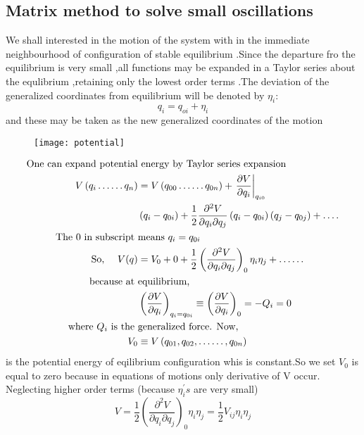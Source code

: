 \subsection{Matrix method to solve small oscillations}
We shall interested in the motion of the system with in the immediate neighbourhood of configuration of stable equilibrium .Since the departure fro the equilibrium is very small ,all functions may be expanded in a Taylor series about the equlibrium ,retaining only the lowest order terms .The deviation of the generalized coordinates from equilibrium will be denoted by $\eta_i$:\\
$$q_i=q_{oi}+\eta_i$$
and these may be taken as the new generalized coordinates of the motion  
\begin{figure}[H]
	\centering
	\texttt{[image: potential]}
	\caption{}
	\label{}
\end{figure}
\begin{align}
\text{One can expand potential}&\text{ energy by Taylor series expansion}\notag\\
V\left(q_{i} \ldots \ldots q_{n}\right)&=V\left(q_{00} \ldots \ldots q_{0 n}\right)+\left.\frac{\partial V}{\partial q_{i}}\right|_{q_{i 0}}\notag\\
&\left(q_{i}-q_{0 i}\right)+\frac{1}{2} \frac{\partial^{2} V}{\partial q_{i} \partial q_{j}}\left(q_{i}-q_{0 i}\right)\left(q_{j}-q_{0 j}\right)+\ldots .\notag\\
\text{The 0 in subscript }&\text{means }q_{i}=q_{0 i}\notag\\
\text{So, }\quad V(q)&=V_{0}+0+\frac{1}{2}\left(\frac{\partial^{2} V}{\partial q_{i} \partial q_{j}}\right)_{0} \eta_{i} \eta_{j}+\ldots \ldots \label{ref1}\\
\text{because at }&\text{equilibrium,}\notag\\
&\left(\frac{\partial V}{\partial q_{i}}\right)_{q_{i}=q_{0 i}} \equiv\left(\frac{\partial V}{\partial q_{i}}\right)_{0}=-Q_{i}=0\notag\\
\text{where $Q_{i}$ is the }&\text{generalized force. Now,}\\
V_{0} &\equiv V\left(q_{01}, q_{02}, \ldots \ldots, q_{0 n}\right) \label{ref2}
\end{align}
 is the potential energy of eqilibrium configuration whis is constant.So we set $V_0$ is equal to zero because in equations of motions only derivative of V occur.\\
 Neglecting higher order terms (because $\eta_{i}^{\prime} s$ are very small)
 \begin{equation}
 V=\frac{1}{2}\left(\frac{\partial^{2} V}{\partial q_{i} \partial q_{j}}\right)_{0} \eta_{i} \eta_{j}=\frac{1}{2} V_{i j} \eta_{i} \eta_{j} \label{ref3}
 \end{equation}
